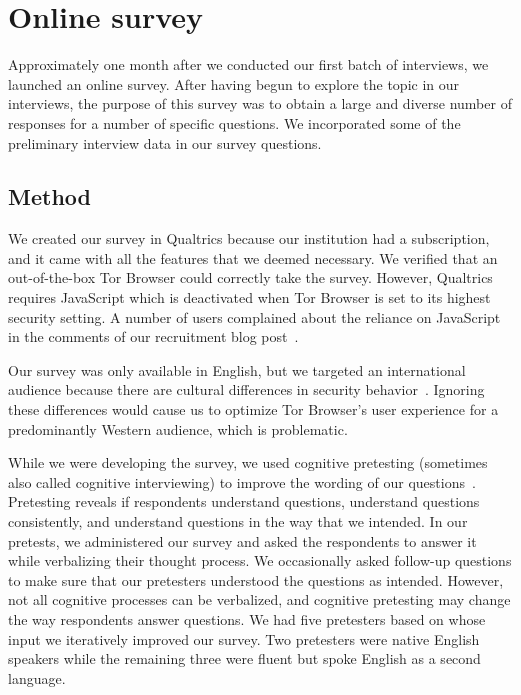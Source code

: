 \section{Online survey}
\label{sec:online-survey}

Approximately one month after we conducted our first batch of interviews, we
launched an online survey.  After having begun to explore the topic in our
interviews, the purpose of this survey was to obtain a large and diverse number
of responses for a number of specific questions.  We incorporated some of the
preliminary interview data in our survey questions.

\subsection{Method}
\label{sec:survey-design}

We created our survey in Qualtrics because our institution had a subscription,
and it came with all the features that we deemed necessary.  We verified that an
out-of-the-box Tor Browser could correctly take the survey.  However, Qualtrics
requires JavaScript which is deactivated when Tor Browser is set to its highest
security setting.  A number of users complained about the reliance on JavaScript
in the comments of our recruitment blog post~\cite{Winter2017a}.

Our survey was only available in English, but we targeted an international
audience because there are cultural differences in security
behavior~\cite{Sawaya2017a}.  Ignoring these differences would cause us to
optimize Tor Browser's user experience for a predominantly Western audience,
which is problematic.

While we were developing the survey, we used cognitive pretesting (sometimes
also called cognitive interviewing) to improve the wording of our
questions~\cite{Collins2003a}.  Pretesting reveals if respondents \first
understand questions, \second understand questions consistently, and \third
understand questions in the way that we intended.  In our pretests, we administered
our survey and asked the respondents to answer it while verbalizing their thought
process.  We occasionally asked follow-up questions to make sure that our
pretesters understood the questions as intended.  However, not all cognitive
processes can be verbalized, and cognitive pretesting may change the way
respondents answer questions.  We had five pretesters based on whose input we
iteratively improved our survey.  Two pretesters were native English speakers
while the remaining three were fluent but spoke English as a second language.

